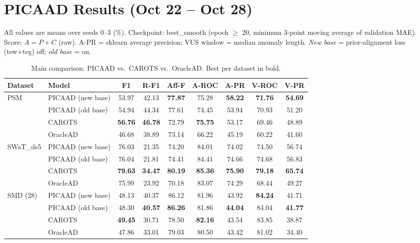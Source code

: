\documentclass[10pt]{article}
\newcommand{\B}[1]{\textbf{#1}}
\begin{document}
\section*{PICAAD Results (Oct 22 -- Oct 28)}

\noindent
All values are means over seeds 0--3 (\%). Checkpoint: best\_smooth (epoch $\ge$ 20, minimum 3-point moving average of validation MAE).
Score: $A = P + C$ (raw). A-PR = sklearn average precision; VUS window = median anomaly length.
\emph{New base} = prior-alignment loss (tew+teg) off; \emph{old base} = on.

\begin{table}[h]
\centering
\caption{Main comparison: PICAAD vs.\ CAROTS vs.\ OracleAD. Best per dataset in bold.}
\label{tab:main}
\begin{tabular}{llccccccc}
\toprule
Dataset & Model & F1 & R-F1 & Aff-F & A-ROC & A-PR & V-ROC & V-PR \\
\midrule
\multirow{4}{*}{PSM}
 & PICAAD (new base) & 53.97 & 42.13 & \B{77.87} & 75.28 & \B{58.22} & \B{71.76} & \B{54.69} \\
 & PICAAD (old base) & 54.94 & 44.34 & 77.61 & 74.45 & 53.94 & 70.93 & 51.20 \\
 & CAROTS            & \B{56.76} & \B{46.78} & 72.79 & \B{75.75} & 53.17 & 69.46 & 48.89 \\
 & OracleAD          & 46.68 & 38.89 & 73.14 & 66.22 & 45.19 & 60.22 & 41.60 \\
\midrule
\multirow{4}{*}{SWaT\_ds5}
 & PICAAD (new base) & 76.03 & 21.35 & 74.20 & 84.01 & 74.02 & 74.50 & 56.74 \\
 & PICAAD (old base) & 76.04 & 21.81 & 74.41 & 84.41 & 74.66 & 74.68 & 56.83 \\
 & CAROTS            & \B{79.63} & \B{34.47} & \B{80.19} & \B{85.36} & \B{75.90} & \B{79.18} & \B{65.74} \\
 & OracleAD          & 75.99 & 23.92 & 70.18 & 83.07 & 74.29 & 68.44 & 49.27 \\
\midrule
\multirow{4}{*}{SMD (28)}
 & PICAAD (new base) & 48.13 & 40.37 & 86.12 & 81.96 & 43.92 & \B{84.24} & 41.71 \\
 & PICAAD (old base) & 48.30 & \B{40.57} & \B{86.26} & 81.86 & \B{44.04} & 84.04 & \B{41.77} \\
 & CAROTS            & \B{49.45} & 30.71 & 78.50 & \B{82.16} & 43.54 & 83.85 & 38.87 \\
 & OracleAD          & 47.86 & 33.01 & 79.03 & 80.50 & 43.42 & 81.02 & 34.40 \\
\bottomrule
\end{tabular}
\end{table}
\end{document}
